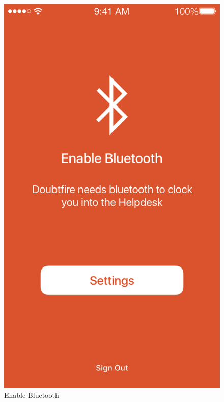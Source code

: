 \documentclass[a4paper,12pt]{article}
\begin{document}
\begin{figure}[p]
\centering
\includegraphics[scale=0.5]{f654931210.png}
\caption{Enable Bluetooth}
\label{14}
\end{figure}
\end{document}
